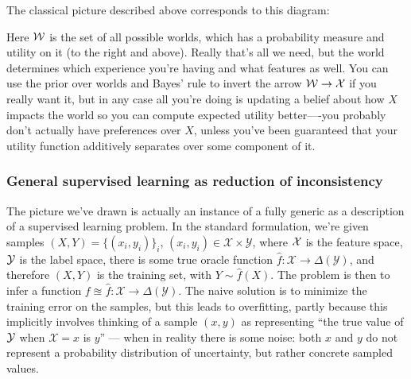 \documentclass{article}
\begin{document}
	
	The classical picture described above corresponds to this diagram:
	\begin{center}
	\end{center}
	Here $\cal W$ is the set of all possible worlds, which has a probability measure and utility on it (to the right and above). Really that's all we need, but the world determines which experience you're having and what features as well. You can use the prior over worlds and Bayes' rule to invert the arrow $\cal W \to X$ if you really want it, but in any case all you're doing is updating a belief about how $X$ impacts the world so you can compute expected utility better----you probably don't actually have preferences over $X$, unless you've been guaranteed that your utility function additively separates over some component of it.



	
	\subsubsection{General supervised learning as reduction of inconsistency}
	
	The picture we've drawn is actually an instance of a fully generic as a description of a supervised learning problem. In the standard formulation, we're given samples $(X, Y) = \{(x_i,y_i)\}_i$,  $(x_i,y_i) \in \mathcal X \times\mathcal Y$, where $\cal X$ is the feature space, $\cal Y$ is the label space, there is some true oracle function $\hat f : \mathcal X \to \Delta(\mathcal Y)$, and therefore $(X, Y)$ is the training set, with $Y \sim \hat f(X)$. The problem is then to infer a function $f \approxeq \hat f : \mathcal X \to \Delta(\mathcal Y)$. The naive solution is to minimize the training error on the samples, but this leads to overfitting, partly because this implicitly involves thinking of a sample $(x, y)$ as representing ``the true value of $\cal Y$ when $\mathcal X = x$ is $y$'' --- when in reality there is some noise: both $x$ and $y$ do not represent a probability distribution of uncertainty, but rather concrete sampled values. 
	
\end{document}
